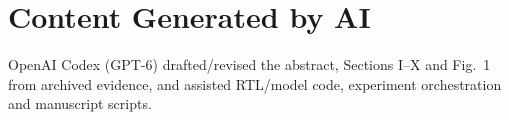 \section*{Content Generated by AI}
OpenAI Codex (GPT-6) drafted/revised the abstract, Sections I--X and Fig.~1 from archived evidence, and assisted RTL/model code, experiment orchestration and manuscript scripts.
